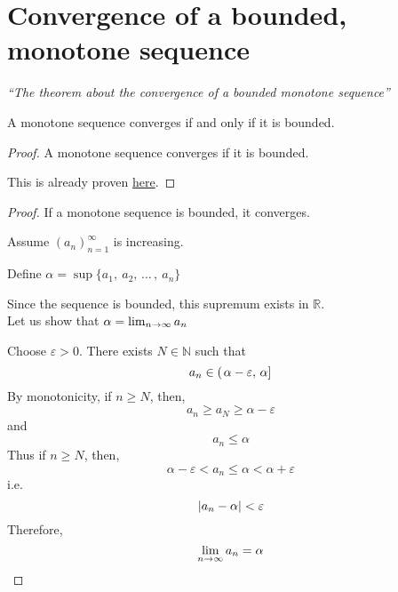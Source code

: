 \documentclass[12pt]{report}
\begin{document}
    \section{Convergence of a bounded, monotone sequence}
    \label{Convergence of a bounded, monotone sequence}
    \textit{``The theorem about the convergence of a bounded monotone sequence''} \vspace{3mm}
    \begin{theorem}
        A monotone sequence converges if and only if it is bounded.
    \end{theorem}
    \begin{proof}
        A monotone sequence converges if it is bounded.
        
        This is already proven \hyperref[Convergence of a bounded sequence]{here}.
    \end{proof}
    \begin{proof}
        If a monotone sequence is bounded, it converges.
                
        Assume \(\left(a_n\right)^\infty _{n=1}\) is increasing.
        
        Define \(\alpha = \sup \{a_1,~ a_2, \, \dots \, , ~ a_n\}\)

        Since the sequence is bounded, this supremum exists in \(\mathbb{R}\).
        \vspace{5mm}
        \\
        Let us show that \(\alpha = \lim_{n \to \infty} a_n\)
        
        Choose \(\varepsilon > 0\). There exists \(N \in \mathbb{N}\) such that 
        \[a_n \in \left( \left. \alpha - \varepsilon, \, \alpha \right] \right.\]
        By monotonicity, if \(n \geq N\), then,
        \[a_n \geq a_N \geq \alpha - \varepsilon\]
        and
        \[a_n \leq \alpha\]
        Thus if \(n \geq N\), then,
        \[\alpha - \varepsilon < a_n \leq \alpha < \alpha + \varepsilon\]
        i.e.
        \[\left| a_n - \alpha \right| < \varepsilon\]
        Therefore,
        \[\lim_{n \to \infty} a_n = \alpha\]
    \end{proof} 
\end{document}
